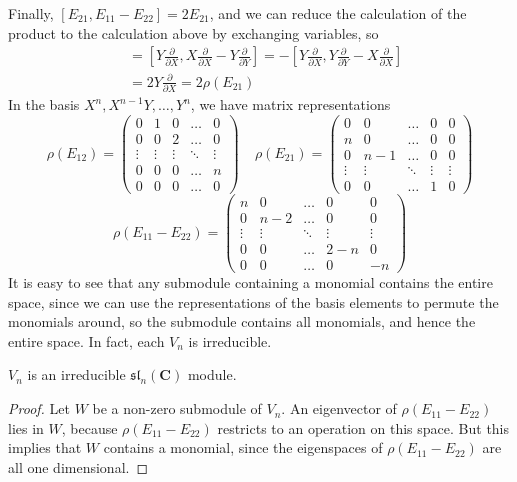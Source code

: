 %
Finally, $[E_{21}, E_{11} - E_{22}] = 2E_{21}$, and we can reduce the calculation of the product to the calculation above by exchanging variables, so
%
\begin{align*}
    [\rho(E_{21}), \rho(E_{11} - E_{22})] &= \left[ Y \frac{\partial}{\partial X}, X \frac{\partial}{\partial X} - Y \frac{\partial}{\partial Y} \right] = - \left[ Y \frac{\partial}{\partial X}, Y \frac{\partial}{\partial Y} - X \frac{\partial}{\partial X} \right]\\
    &= 2 Y \frac{\partial}{\partial X} = 2 \rho(E_{21})
\end{align*}
%
In the basis $X^n,X^{n-1}Y, \dots, Y^n$, we have matrix representations
%
\[ \rho(E_{12}) = \begin{pmatrix} 0 & 1 & 0 & \dots & 0 \\ 0 & 0 & 2 & \dots & 0 \\ \vdots & \vdots & \vdots & \ddots & \vdots \\ 0 & 0 & 0 & \dots & n \\ 0 & 0 & 0 & \dots & 0 \end{pmatrix}\ \ \ \ \ \rho(E_{21}) = \begin{pmatrix} 0 & 0 & \dots & 0 & 0 \\ n & 0 & \dots & 0 & 0 \\ 0 & n-1 & \dots & 0 & 0 \\ \vdots & \vdots & \ddots & \vdots & \vdots \\ 0 & 0 & \dots & 1 & 0 \end{pmatrix} \]
\[ \rho(E_{11} - E_{22}) = \begin{pmatrix} n & 0 & \dots & 0 & 0 \\ 0 & n-2 & \dots & 0 & 0 \\ \vdots & \vdots & \ddots & \vdots & \vdots \\ 0 & 0 & \dots & 2 - n & 0 \\ 0 & 0 & \dots & 0 & -n \end{pmatrix} \]
%
It is easy to see that any submodule containing a monomial contains the entire space, since we can use the representations of the basis elements to permute the monomials around, so the submodule contains all monomials, and hence the entire space. In fact, each $V_n$ is irreducible.

\begin{theorem}
    $V_n$ is an irreducible $\mathfrak{sl}_n(\mathbf{C})$ module.
\end{theorem}
\begin{proof}
    Let $W$ be a non-zero submodule of $V_n$. An eigenvector of $\rho(E_{11} - E_{22})$ lies in $W$, because $\rho(E_{11} - E_{22})$ restricts to an operation on this space. But this implies that $W$ contains a monomial, since the eigenspaces of $\rho(E_{11} - E_{22})$ are all one dimensional.
\end{proof}

